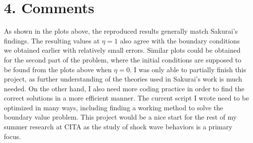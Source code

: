 \documentclass{article}
\begin{document}
\section*{4. Comments}
As shown in the plots above, the reproduced results generally match Sakurai's findings. The resulting values at $\eta=1$ also agree with the boundary conditions we obtained earlier with  relatively small errors. 
\bigbreak
Similar plots could be obtained for the second part of the problem, where the initial conditions are supposed to be found from the plots above when $\eta=0$.
\bigbreak
I was only able to partially finish this project, as further understanding of the theories used in Sakurai's work is much needed. On the other hand, I also need more coding practice in order to find the correct solutions in a more efficient manner. The current script I wrote need to be optimized in many ways, including finding a working method to solve the boundary value problem.
\bigbreak
This project would be a nice start for the rest of my summer research at CITA as the study of shock wave behaviors is a primary focus. 
\end{document}
